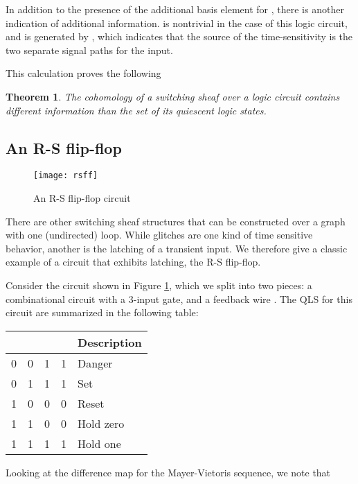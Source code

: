 \documentclass{amsart}
\theoremstyle{plain}
\newtheorem{thm}{Theorem}
\theoremstyle{definition}
\begin{document}
In addition to the presence of the additional basis element for
, there is another indication of additional
information.   is nontrivial in the case of this
logic circuit, and is generated by
, which indicates that
the source of the time-sensitivity is the two separate signal paths
for the input.

This calculation proves the following 

\begin{thm}
The cohomology of a switching sheaf over a logic circuit contains
different information than the set of its quiescent logic states.
\end{thm}

\subsection{An R-S flip-flop}

\begin{figure}
\begin{center}
\texttt{[image: rsff]}
\caption{An R-S flip-flop circuit}
\label{rsff_fig}
\end{center}
\end{figure}

There are other switching sheaf structures that can be constructed over a graph with one (undirected) loop.  While glitches are one kind of time sensitive behavior, another is the latching of a transient input.  We therefore give a classic example of a circuit that exhibits latching, the R-S flip-flop.

Consider the circuit  shown in Figure \ref{rsff_fig}, which we split into two pieces: a combinational circuit  with a 3-input gate, and a feedback wire .  The QLS for this circuit \cite{Shannon_1940} are summarized in the following table:

\begin{center}
\begin{tabular}{ccc|c|l}
&&&&Description\\
\hline
0&0&1&1&Danger\\
0&1&1&1&Set\\
1&0&0&0&Reset\\
1&1&0&0&Hold zero\\
1&1&1&1&Hold one\\
\end{tabular}
\end{center}

Looking at the difference map  for the Mayer-Vietoris sequence, we note that
\end{document}
